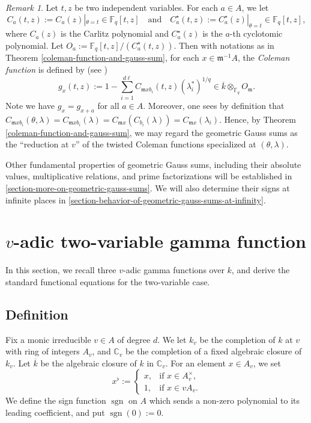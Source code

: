 \documentclass[11pt]{amsart}
\theoremstyle{plain}
\theoremstyle{definition}
\theoremstyle{remark}
\newtheorem{rem}[thm]{Remark}
\numberwithin{equation}{section}
\newcommand{\CC}{\mathbb{C}}
\newcommand{\FF}{\mathbb{F}}
\newcommand{\mfk}{\mathfrak{m}}
\newcommand{\sgn}{\operatorname{sgn}}
\newcommand{\ovl}{\overline}
\newcommand{\Fq}{\FF_q}
\newcommand{\T}{\theta}
\let\l\ell
\begin{document}
	\begin{rem}   \label{ggs-and-coleman-remark}
		Let $t,z$ be two independent variables.
		For each $a \in A$, we let
		$$
		C_a(t,z) := C_a(z)|_{\T = t} \in \Fq[t,z]
		\quad
		\text{and}
		\quad
		C_a^\star (t,z) := C_a^\star(z)|_{\T = t} \in \Fq[t,z],
		$$
		where $C_a(z)$ is the Carlitz polynomial and $C_a^\star (z)$ is the $a$-th cyclotomic polynomial.
		Let $O_a := \Fq[t,z]/(C_a^\star (t,z))$.
		Then with notations as in Theorem \ref{coleman-function-and-gauss-sum}, for each $x \in \mfk^{-1}A$, the \textit{Coleman function} is defined by (see \cite[.5]{abp2004determination})
		$$
		g_x(t,z) := 1 - \sum_{i=1}^{d\l} C_{\mfk xb_i}(t,z) (\lambda_i^*)^{1/q}
		\in \ovl{k} \otimes_{\Fq} O_\mfk.
		$$
		Note we have $g_x = g_{x+a}$ for all $a \in A$.
		Moreover, one sees by definition that $C_{\mfk xb_i}(\T,\lambda) = C_{\mfk xb_i}(\lambda) = C_{\mfk x}(C_{b_i}(\lambda))
		= C_{\mfk x}(\lambda_i)$.
		Hence, by Theorem \ref{coleman-function-and-gauss-sum}, we may regard the geometric Gauss sums as the “reduction at $v$” of the twisted Coleman functions specialized at $(\T,\lambda)$.
	\end{rem}
	
	Other fundamental properties of geometric Gauss sums, including their absolute values, multiplicative relations, and prime factorizations will be established in \ref{section-more-on-geometric-gauss-sums}.
	We will also determine their signs at infinite places in \ref{section-behavior-of-geometric-gauss-sums-at-infinity}.
	
	\section{\texorpdfstring{$v$}{v}-adic two-variable gamma function}     \label{section-v-adic-two-variable-gamma-function}
	
	In this section, we recall three $v$-adic gamma functions over $k$, and derive the standard functional equations for the two-variable case.
	
	\subsection{Definition}
	
	Fix a monic irreducible $v\in A$ of degree $d$.
	We let $k_v$ be the completion of $k$ at $v$ with ring of integers $A_v$, and $\CC_v$ be the completion of a fixed algebraic closure of $k_v$.
	Let $\ovl{k}$ be the algebraic closure of $k$ in $\CC_v$.
	For an element $x\in A_v$, we set
	$$
	x^\flat := 
	\begin{cases}
		x, & \text{if } x \in A_v^\times, \\
		1, & \text{if } x\in v A_v.
	\end{cases}
	$$
	We define the sign function $\sgn$ on $A$ which sends a non-zero polynomial to its leading coefficient, and put $\sgn(0) := 0$.
	
\end{document}

